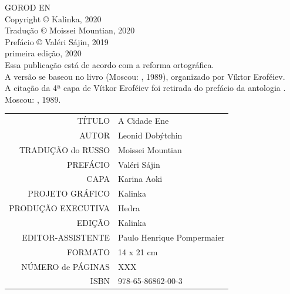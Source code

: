 \newpage
\pagestyle{empty}
\MyriadPro
\scriptsize
\begin{center}
GOROD EN\\[6pt]

Copyright © Kalinka, 2020\\[6pt]

Tradução © Moissei Mountian, 2020\\[6pt]

Prefácio © Valéri Sájin, 2019\\[6pt]

primeira edição, 2020\\[40pt]


Essa publicação está de acordo com a reforma ortográfica.\\[6pt]
A versão se baseou no livro {} (Moscou: {}, 1989), organizado por Víktor Eroféiev.\\[6pt]	
A citação da 4ª capa de Vítkor Eroféiev foi retirada do prefácio da antologia {}. Moscou: {}, 1989.\\[20pt]
\end{center}


\bigskip

\begin{vplace}[1]
\begin{table}[ht!]
\centering
\MyriadPro\itshape
\scriptsize
\begin{tabular}{rl}
TÍTULO            & A Cidade Ene 									   \\[2pt]
AUTOR             & Leonid Dobýtchin                          		   \\[2pt]
TRADUÇÃO do RUSSO & Moissei Mountian 				                   \\[2pt]
PREFÁCIO          & Valéri Sájin	                                   \\[2pt]
CAPA              & Karina Aoki		                                   \\[2pt]
PROJETO GRÁFICO   & Kalinka                                            \\[2pt]
PRODUÇÃO EXECUTIVA & Hedra                                             \\[2pt]
EDIÇÃO            & Kalinka 		                                   \\[2pt] 
EDITOR-ASSISTENTE & Paulo Henrique Pompermaier                         \\[2pt] 
FORMATO           & 14 x 21 cm                                         \\[2pt]
NÚMERO de PÁGINAS & XXX                                                \\[2pt]
ISBN              & 978-65-86862-00-3                                 
\end{tabular}
\end{table}
\end{vplace}

